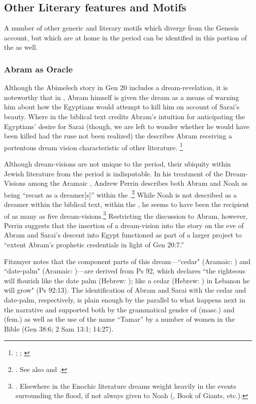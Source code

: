 \subsection{Other Literary features and Motifs}
A number of other generic and literary motifs which diverge from the Genesis account, but which are at home in the \secondtemple period can be identified in this portion of the \ga as well.

\subsubsection{Abram as Oracle}
Although the Abimelech story in Gen 20 includes a dream-revelation, it is noteworthy that in \ga, Abram himself is given the dream as a means of warning him about how the Egyptians would attempt to kill him on account of Sarai's beauty. Where in the biblical text credits Abram's intuition for anticipating the Egyptians' desire for Sarai (though, we are left to wonder whether he would have been killed had the ruse not been realized) the \ga describes Abram receiving a portentous dream vision characteristic of other \secondtemple literature.%
%
\footnote{\cite{gevirtz_maarav1992}; \cite[184]{fitzmyer2004}; \cite{dacy_tzoref2013}}
%

Although dream-visions are not unique to the \secondtemple period, their ubiquity within Jewish literature from the \secondtemple period is indisputable. In his treatment of the Dream-Visions among the Aramaic \dss, Andrew Perrin describes both Abram and Noah as being ``recast as a dreamer[s]'' within the \ga.\footnote{\cite[52--57]{perrin2015}. See also \cite{eshel_klostergaard-etal2009} and \cite{machiela_falk-etal2010}.} While Noah is not described as a dreamer within the biblical text, within the \ga, he seems to have been the recipient of as many as five dream-visions.\footnote{\cite[53]{perrin2015}. Elsewhere in the Enochic literature dreams weight heavily in the events surrounding the flood, if not always given to Noah (\firstenoch, Book of Giants, etc.).} Restricting the discussion to Abram, however, Perrin suggests that the insertion of a dream-vision into the story on the eve of Abram and Sarai's descent into Egypt functioned as part of a larger project to ``extent Abram's prophetic credentials in light of Gen 20:7.''\autocite[55]{perrin2015} 

Fitzmyer notes that the component parts of this dream---``cedar" (Aramaic: ) and ``date-palm" (Aramaic: )---are derived from Ps 92, which declares ``the righteous will flourish like the date palm (Hebrew: ); like a cedar (Hebrew: ) in Lebanon he will grow" (Ps 92:13). The identification of Abram and Sarai with the cedar and date-palm, respectively, is plain enough by the parallel to what happens next in the narrative and supported both by the grammatical gender of  (masc.) and  (fem.) as well as the use of the name ``Tamar'' by a number of women in the Bible (Gen 38:6; 2 Sam 13:1; 14:27).

